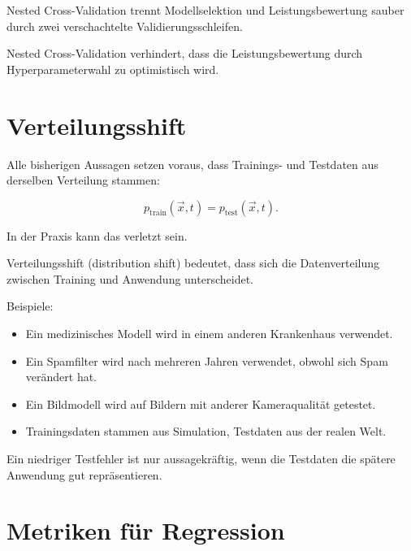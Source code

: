 \begin{definitionbox}
Nested Cross-Validation trennt Modellselektion und Leistungsbewertung sauber durch zwei verschachtelte Validierungsschleifen.
\end{definitionbox}

\begin{conceptbox}
Nested Cross-Validation verhindert, dass die Leistungsbewertung durch Hyperparameterwahl zu optimistisch wird.
\end{conceptbox}

\section{Verteilungsshift}

Alle bisherigen Aussagen setzen voraus, dass Trainings- und Testdaten aus derselben Verteilung stammen:

\[
    p_{\mathrm{train}}(\vec{x},t)
    =
    p_{\mathrm{test}}(\vec{x},t).
\]

In der Praxis kann das verletzt sein.

\begin{definitionbox}
Verteilungsshift (distribution shift) bedeutet, dass sich die Datenverteilung zwischen Training und Anwendung unterscheidet.
\end{definitionbox}

Beispiele:

\begin{itemize}
    \item Ein medizinisches Modell wird in einem anderen Krankenhaus verwendet.
    \item Ein Spamfilter wird nach mehreren Jahren verwendet, obwohl sich Spam verändert hat.
    \item Ein Bildmodell wird auf Bildern mit anderer Kameraqualität getestet.
    \item Trainingsdaten stammen aus Simulation, Testdaten aus der realen Welt.
\end{itemize}

\begin{notebox}
Ein niedriger Testfehler ist nur aussagekräftig, wenn die Testdaten die spätere Anwendung gut repräsentieren.
\end{notebox}

\section{Metriken für Regression}

